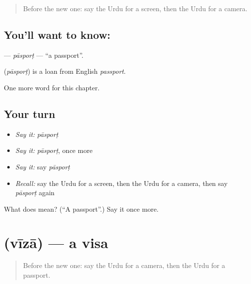 \label{lesson:UR-C198-pasport}



\begin{quote}
Before the new one: say the Urdu for a screen, then the Urdu for a camera.
\end{quote}

\subsection*{You'll want to know: }
\textbf{} — \emph{pāsporṭ} — \textquotedblleft{}a passport\textquotedblright{}.

\begin{cousinweb}
\textbf{} (\emph{pāsporṭ}) is a loan from English \emph{passport}.
\end{cousinweb}

\begin{grammarlens}[title={What you've built}]
One more word for this chapter.
\end{grammarlens}

\subsection*{Your turn}
\begin{itemize}
\raggedright
  \item \emph{Say it:} \emph{pāsporṭ}
  \item \emph{Say it:} \emph{pāsporṭ}, once more
  \item \emph{Say it:} say \emph{pāsporṭ}
  \item \emph{Recall:} say the Urdu for a screen, then the Urdu for a camera, then say \emph{pāsporṭ} again
\end{itemize}

\begin{tcolorbox}[breakable,colback=teal!4,colframe=teal!35!black,title={Before you move on}]
What does  mean? (\textquotedblleft{}A passport\textquotedblright{}.) Say it once more.
\end{tcolorbox}
\section[\texorpdfstring{\ur{ویزا} (vīzā)}{ویزا (vīzā)}]{ (vīzā) — a visa}

\label{lesson:UR-C198-viza}



\begin{quote}
Before the new one: say the Urdu for a camera, then the Urdu for a passport.
\end{quote}


